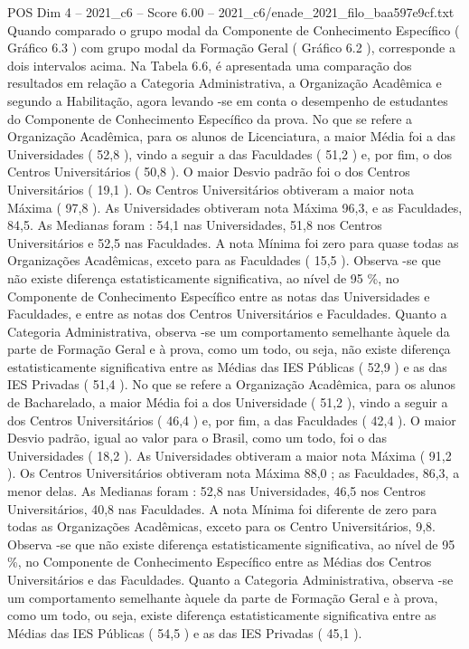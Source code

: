 \begin{textsample}{POS Dim 4 – 2021\_c6 – Score 6.00 – 2021\_c6/enade\_2021\_filo\_baa597e9cf.txt}
Quando comparado o grupo modal da Componente de Conhecimento Específico ( Gráfico 6.3 ) com grupo modal da Formação Geral ( Gráfico 6.2 ), corresponde a dois intervalos acima.
Na Tabela 6.6, é apresentada uma comparação dos resultados em relação a Categoria Administrativa, a Organização Acadêmica e segundo a Habilitação, agora levando -se em conta o desempenho de estudantes do Componente de Conhecimento Específico da prova.
No que se refere a Organização Acadêmica, para os alunos de Licenciatura, a maior Média foi a das Universidades ( 52,8 ), vindo a seguir a das Faculdades ( 51,2 ) e, por fim, o dos Centros Universitários ( 50,8 ).
O maior Desvio padrão foi o dos Centros Universitários ( 19,1 ).
Os Centros Universitários obtiveram a maior nota Máxima ( 97,8 ).
As Universidades obtiveram nota Máxima 96,3, e as Faculdades, 84,5.
As Medianas foram : 54,1 nas Universidades, 51,8 nos Centros Universitários e 52,5 nas Faculdades.
A nota Mínima foi zero para quase todas as Organizações Acadêmicas, exceto para as Faculdades ( 15,5 ).
Observa -se que não existe diferença estatisticamente significativa, ao nível de 95 \%, no Componente de Conhecimento Específico entre as notas das Universidades e Faculdades, e entre as notas dos Centros Universitários e Faculdades.
Quanto a Categoria Administrativa, observa -se um comportamento semelhante àquele da parte de Formação Geral e à prova, como um todo, ou seja, não existe diferença estatisticamente significativa entre as Médias das IES Públicas ( 52,9 ) e as das IES Privadas ( 51,4 ).
No que se refere a Organização Acadêmica, para os alunos de Bacharelado, a maior Média foi a dos Universidade ( 51,2 ), vindo a seguir a dos Centros Universitários ( 46,4 ) e, por fim, a das Faculdades ( 42,4 ).
O maior Desvio padrão, igual ao valor para o Brasil, como um todo, foi o das Universidades ( 18,2 ).
As Universidades obtiveram a maior nota Máxima ( 91,2 ).
Os Centros Universitários obtiveram nota Máxima 88,0 ; as Faculdades, 86,3, a menor delas.
As Medianas foram : 52,8 nas Universidades, 46,5 nos Centros Universitários, 40,8 nas Faculdades.
A nota Mínima foi diferente de zero para todas as Organizações Acadêmicas, exceto para os Centro Universitários, 9,8.
Observa -se que não existe diferença estatisticamente significativa, ao nível de 95 \%, no Componente de Conhecimento Específico entre as Médias dos Centros Universitários e das Faculdades.
Quanto a Categoria Administrativa, observa -se um comportamento semelhante àquele da parte de Formação Geral e à prova, como um todo, ou seja, existe diferença estatisticamente significativa entre as Médias das IES Públicas ( 54,5 ) e as das IES Privadas ( 45,1 ).

\end{textsample}
